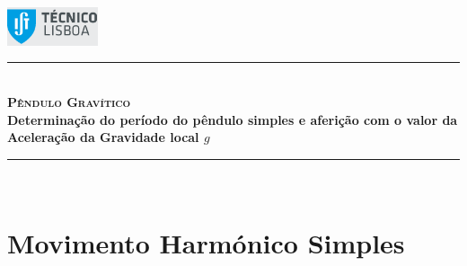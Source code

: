 \documentclass[a4paper,twoside,12pt]{article}      %
\author{Prof. Bernardo B. Carvalho}
\date{ Setembro 2012}
\newcommand{\HRule}{\rule{\linewidth}{0.5mm}}
\begin{document}
 

\includegraphics[width=0.2\textwidth]{./logo-ist}%
	
	\HRule \\[0.5cm]
	{ \huge   \bfseries \textsc{ Pêndulo Gravítico } }\\[0.4cm]
	{ \large \bfseries Determinação do período do pêndulo simples e aferição com o valor da Aceleração da Gravidade local $g$  }\\
	\HRule \\%
	
%	 


\section{\sf Movimento Harmónico Simples}
\end{document}
